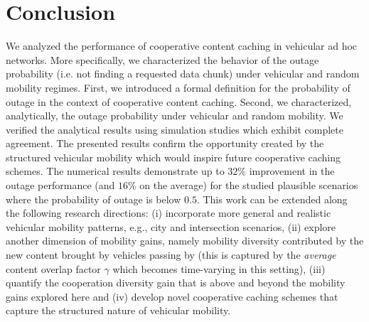 \documentclass[conference,a4paper]{IEEEtran}
\begin{document}
\section{Conclusion \label{sec:conclusion}}
We analyzed the performance of cooperative content caching in vehicular ad hoc networks. More specifically, we characterized the behavior of the outage probability (i.e. not finding a requested data chunk) under vehicular and random mobility regimes. First, we introduced a formal definition for the probability of outage in the context of cooperative content caching. Second, we characterized, analytically, the outage probability under vehicular and random mobility. We verified the analytical results using simulation studies which exhibit complete agreement. The presented results confirm the opportunity created by the structured vehicular mobility which would inspire future cooperative caching schemes. The numerical results demonstrate up to $32\%$ improvement in the outage performance (and $16\%$ on the average) for the studied plausible scenarios where the probability of outage is below $0.5$. This work can be extended along the following research directions: (i) incorporate more general and realistic vehicular mobility patterns, e.g., city and intersection scenarios, (ii) explore another dimension of mobility gains, namely mobility diversity contributed by the new content brought by vehicles passing by (this is captured by the {\it average} content overlap factor $\gamma$ which becomes time-varying in this setting), (iii) quantify the cooperation diversity gain that is above and beyond the mobility gains explored here and (iv) develop novel cooperative caching schemes that capture the structured nature of vehicular mobility.

\linespread{1.1}
\end{document}
